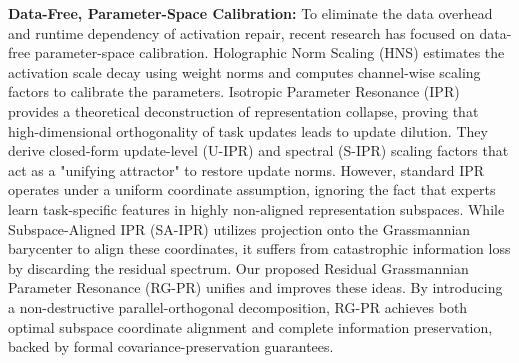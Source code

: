 \documentclass{article}
\theoremstyle{plain}
\theoremstyle{definition}
\theoremstyle{remark}
\begin{document}
\textbf{Data-Free, Parameter-Space Calibration:} To eliminate the data overhead and runtime dependency of activation repair, recent research has focused on data-free parameter-space calibration. Holographic Norm Scaling (HNS) \citep{anonymous2026holographic} estimates the activation scale decay using weight norms and computes channel-wise scaling factors to calibrate the parameters. Isotropic Parameter Resonance (IPR) \citep{anonymous2026isotropic} provides a theoretical deconstruction of representation collapse, proving that high-dimensional orthogonality of task updates leads to update dilution. They derive closed-form update-level (U-IPR) and spectral (S-IPR) scaling factors that act as a "unifying attractor" to restore update norms. However, standard IPR operates under a uniform coordinate assumption, ignoring the fact that experts learn task-specific features in highly non-aligned representation subspaces. While Subspace-Aligned IPR (SA-IPR) utilizes projection onto the Grassmannian barycenter to align these coordinates, it suffers from catastrophic information loss by discarding the residual spectrum. Our proposed Residual Grassmannian Parameter Resonance (RG-PR) unifies and improves these ideas. By introducing a non-destructive parallel-orthogonal decomposition, RG-PR achieves both optimal subspace coordinate alignment and complete information preservation, backed by formal covariance-preservation guarantees.
\end{document}
